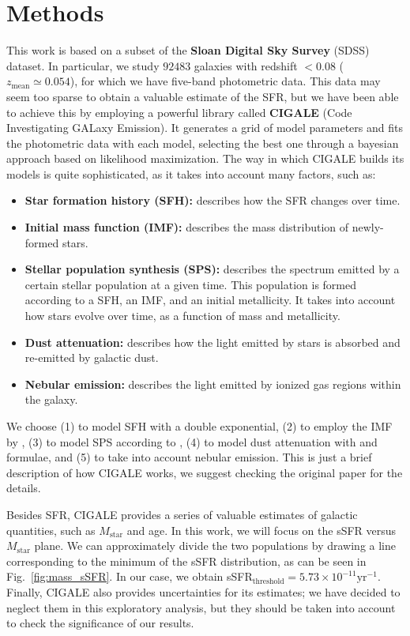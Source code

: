 \documentclass[fleqn,usenatbib]{mnras}
\begin{document}
\section{Methods}\label{sec:methods}
This work is based on a subset of the \textbf{Sloan Digital Sky Survey} (SDSS) dataset. In particular, we study $92483$ galaxies with redshift $< 0.08$ ($z_{\text{mean}} \simeq 0.054$), for which we have five-band photometric data. This data may seem too sparse to obtain a valuable estimate of the SFR, but we have been able to achieve this by employing a powerful library called \textbf{CIGALE} (Code Investigating GALaxy Emission). It generates a grid of model parameters and fits the photometric data with each model, selecting the best one through a bayesian approach based on likelihood maximization. The way in which CIGALE builds its models is quite sophisticated, as it takes into account many factors, such as:
\begin{itemize}[left=6pt]
    \item \textbf{Star formation history (SFH):} describes how the SFR changes over time.
    \item \textbf{Initial mass function (IMF):} describes the mass distribution of newly-formed stars.
    \item \textbf{Stellar population synthesis (SPS):} describes the spectrum emitted by a certain stellar population at a given time. This population is formed according to a SFH, an IMF, and an initial metallicity. It takes into account how stars evolve over time, as a function of mass and metallicity.
    \item \textbf{Dust attenuation:} describes how the light emitted by stars is absorbed and re-emitted by galactic dust.
    \item \textbf{Nebular emission:} describes the light emitted by ionized gas regions within the galaxy.
\end{itemize}
We choose (1) to model SFH with a double exponential, (2) to employ the IMF by \citet{Chabrier_2003}, (3) to model SPS according to \citet{Bruzual_2003}, (4) to model dust attenuation with \citet{Calzetti_2000} and \citet{Leitherer_2002} formulae, and (5) to take into account nebular emission. This is just a brief description of how CIGALE works, we suggest checking the original paper \citep{Boquien_2019} for the details.

Besides SFR, CIGALE provides a series of valuable estimates of galactic quantities, such as $M_{\text{star}}$ and age. In this work, we will focus on the sSFR versus $M_{\text{star}}$ plane. We can approximately divide the two populations by drawing a line corresponding to the minimum of the sSFR distribution, as can be seen in Fig.~\ref{fig:mass_sSFR}. In our case, we obtain sSFR$_{\text{threshold}} = 5.73 \times 10^{-11} \text{yr}^{-1}$. Finally, CIGALE also provides uncertainties for its estimates; we have decided to neglect them in this exploratory analysis, but they should be taken into account to check the significance of our results.
\end{document}
